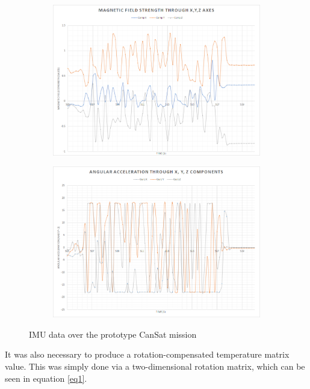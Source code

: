 \documentclass[]{report}
\begin{document}
	\begin{figure}
		\centering
		\begin{subfigure}{.5\textwidth}
			\centering
			\includegraphics[width=1\linewidth]{mag.png}
		\end{subfigure}%
		\begin{subfigure}{.5\textwidth}
			\centering
			\includegraphics[width=1\linewidth, angle=0]{gyro.png}
		\end{subfigure}
		\caption{IMU data over the prototype CanSat mission}
		\label{pimu}
	\end{figure}

	It was also necessary to produce a rotation-compensated temperature matrix value. This was simply done via a two-dimensional rotation matrix, which can be seen in equation \ref{eq1}. 
	
\end{document}
